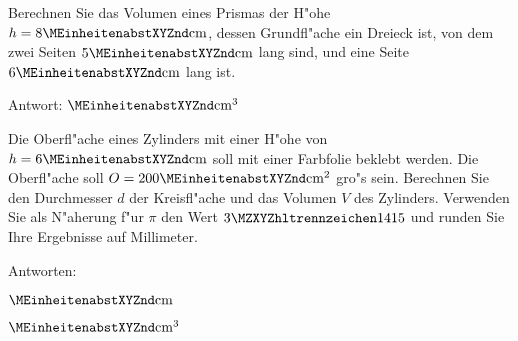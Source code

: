 \begin{MExercises}

\begin{MExercise}
Berechnen Sie das Volumen eines Prismas der H"ohe $h = 8\MEinheit{cm}$, dessen 
Grundfl"ache ein Dreieck ist, von dem zwei Seiten $5\MEinheit{cm}$ lang sind,
und eine Seite $6\MEinheit{cm}$ lang ist.
\par
Antwort: $\MEinheit{cm}^3$
\end{MExercise}

\begin{MExercise}
Die Oberfl"ache eines Zylinders mit einer H"ohe von $h = 6\MEinheit{cm}$ 
soll mit einer Farbfolie beklebt werden. Die Oberfl"ache soll 
$O = 200\MEinheit{cm}^2$ gro"s sein. Berechnen Sie den Durchmesser $d$ der 
Kreisfl"ache und das Volumen $V$ des Zylinders.
Verwenden Sie als N"aherung f"ur $\pi$ den Wert $\MZahl{3}{1415}$ und runden 
Sie Ihre Ergebnisse auf Millimeter.

Antworten:
\begin{MExerciseItems}
\item %
 $\MEinheit{cm}$
\item %
 $\MEinheit{cm}^3$
\end{MExerciseItems}
\end{MExercise}


\end{MExercises}
